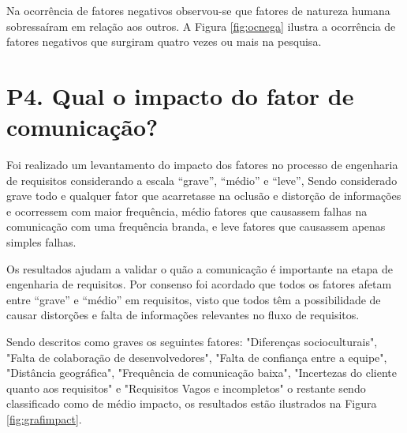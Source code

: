 Na ocorrência de fatores negativos observou-se que fatores de natureza humana sobressaíram em relação aos outros. A Figura \ref{fig:ocnega}
ilustra a ocorrência de fatores negativos que surgiram quatro vezes ou mais na pesquisa. 
   

\begin{figure}[h!] 
   	    \captionsetup{width=16cm}%
	\end{figure}
   

\section{P4. Qual o impacto do fator de comunicação?}

 Foi realizado um levantamento do impacto dos fatores no processo de engenharia de requisitos considerando a escala ``grave'', ``médio'' e ``leve'', Sendo considerado grave todo e qualquer fator que acarretasse na oclusão e distorção de informações e ocorressem com maior frequência, médio fatores que causassem falhas na comunicação com uma frequência branda, e leve fatores que causassem apenas simples falhas.
 
 
 Os resultados ajudam a validar o quão a comunicação é importante na etapa de engenharia de requisitos. Por consenso foi acordado que todos os fatores afetam entre ``grave'' e ``médio'' em requisitos, visto que todos têm a possibilidade de causar distorções e falta de informações relevantes no fluxo de requisitos.
 
    Sendo descritos como graves os seguintes fatores: 
"Diferenças socioculturais", "Falta de colaboração de desenvolvedores", "Falta de confiança entre a equipe", "Distância geográfica", "Frequência de comunicação baixa", "Incertezas do cliente quanto aos requisitos" e "Requisitos Vagos e incompletos" o restante sendo classificado como de médio impacto, os resultados estão ilustrados na Figura \ref{fig:grafimpact}.


